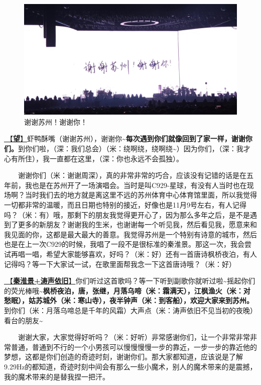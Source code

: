 \documentclass[]{ctexbook}
\begin{document}
\begin{figure}

{\centering \includegraphics[width=400pt]{img/suzhou20241110/thank-suzhou} 

}

\caption{谢谢苏州！谢谢你！}\label{fig:unnamed-chunk-136}
\end{figure}

\hyperref[Gaze]{🎵【\textbf{望}】}虾鸭酥嘴（谢谢苏州），谢谢你\textasciitilde{}\textbf{每次遇到你们就像回到了家一样，谢谢你们。}到你们啦，（深：我们总会）（米：绕啊绕，绕啊绕\textasciitilde）因为你们，（深：我才心有所住），我一直都在这里，（深：你也永远不会孤独）。

  谢谢你们（米：谢谢周深），真的非常非常的巧合，应该没有记错的话是在五年前，我也是在苏州开了一场演唱会。当时是叫C929-星球，有没有人当时也在现场啊？当时我们去的地方就是离这里不远的苏州体育中心体育馆里面，所以我觉得一切都非常的温暖，而且日期也特别的接近，好像也是11月9号左右，有人记得吗？（米：有）哦，那剩下的朋友我觉得更开心了，因为那么多年之后，是不是遇到了更多的新朋友？谢谢我的生米，也谢谢每一个听见我，然后看见我，愿意来和我见面的你，这都是最大最大的善意。我觉得苏州是一个特别有诗意的城市，然后也是在上一次C929的时候，我唱了一段不是很标准的秦淮景。那这一次，我会尝试再唱一唱，希望大家能够喜欢，好吗？（米：好）还有一首唐诗枫桥夜泊，有人记得吗？等一下大家试一试，在歌里面帮我念一下这首唐诗哦？（米：好）

\hyperref[taoshengyijiu]{🎵【\textbf{秦淮景+涛声依旧}】}你们听过这首歌吗？等一下听到副歌你就听过啦\textasciitilde 摇起你们的荧光棒哦\textasciitilde{}\textbf{枫桥夜泊，唐，张继，月落乌啼（米：霜满天），江枫渔火（米：对愁眠），姑苏城外（米：寒山寺），夜半钟声（米：到客船），欢迎大家来到苏州。}到你们（米：月落乌啼总是千年的风霜）大声点（米：涛声依旧不见当初的夜晚）看台的朋友\textasciitilde{}

  谢谢大家，大家觉得好听吗？（米：好听）非常感谢你们，让一个非常非常非常普通，普通到不行的一个小男孩可以慢慢慢慢一步的靠近，一步一步的靠近他的梦想，这都是你们创造的奇迹时刻，谢谢你们。那大家都知道，应该说是了解9.29Hz的都知道，奇迹时刻中间会有那么一些小魔术，别人的魔术带来的是震撼，我的魔术带来的是替我捏一把汗。
\end{document}
